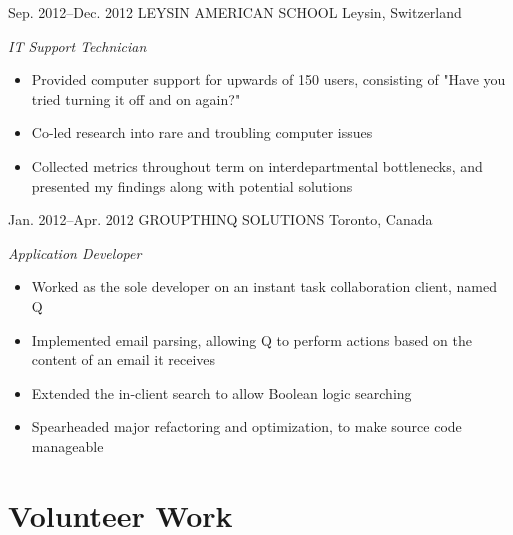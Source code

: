 \documentclass[]{friggeri-cv} %
\begin{document}
\begin{sectionlist}
\entry
{Sep. 2012--Dec. 2012}
{LEYSIN AMERICAN SCHOOL}
{Leysin, Switzerland}
{\emph{IT Support Technician} \\
\begin{itemize}
	\item Provided computer support for upwards of 150 users, consisting of "Have you tried turning it off and on again?" 
	\item Co-led research into rare and troubling computer issues
	\item Collected metrics throughout term on interdepartmental bottlenecks, and presented my findings along with potential solutions 
\end{itemize}
}

\entry
{Jan. 2012--Apr. 2012}
{GROUPTHINQ SOLUTIONS}
{Toronto, Canada}
{\emph{Application Developer} \\
\begin{itemize}
	\item Worked as the sole developer on an instant task collaboration client, named Q
	\item Implemented email parsing, allowing Q to perform actions based on the content of an email it receives 	
	\item Extended the in-client search to allow Boolean logic searching
	\item Spearheaded major refactoring and optimization, to make source code manageable 
\end{itemize}
}
\end{sectionlist}




\section{Volunteer Work}
\end{document}
